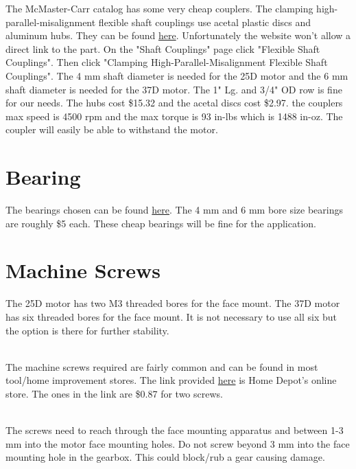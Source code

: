 \documentclass[12pt, onecolumn]{article}
\begin{document}
The McMaster-Carr catalog has some very cheap couplers. The clamping high-parallel-misalignment flexible shaft couplings use acetal plastic discs and aluminum hubs. They can be found \href{https://www.mcmaster.com/shaft-couplings}{here}. Unfortunately the website won't allow a direct link to the part. On the "Shaft Couplings" page click "Flexible Shaft Couplings". Then click "Clamping High-Parallel-Misalignment Flexible Shaft Couplings". The 4 mm shaft diameter is needed for the 25D motor and the 6 mm shaft diameter is needed for the 37D motor. The 1" Lg. and 3/4" OD row is fine for our needs. The hubs cost \$15.32 and the acetal discs cost \$2.97. the couplers max speed is 4500 rpm and the max torque is 93 in-lbs which is 1488 in-oz. The coupler will easily be able to withstand the motor.


\section{Bearing}


The bearings chosen can be found
\href{https://www.grainger.com/category/power-transmission/bearings/ball-bearings/miniature-ball-bearings}{here}. The 4 mm and 6 mm bore size bearings are roughly \$5 each. These cheap bearings will be fine for the application.


\section{Machine Screws}


The 25D motor has two M3 threaded bores for the face mount. The 37D motor has six threaded bores for the face mount. It is not necessary to use all six but the option is there for further stability.\\
\\


The machine screws required are fairly common and can be found in most tool/home improvement stores. The link provided \href{https://www.homedepot.com/p/Everbilt-M3-0-5-x-16-mm-Phillips-Pan-Head-Stainless-Steel-Machine-Screw-2-Pack-842718/204846005}{here} is Home Depot's online store. The ones in the link are \$0.87 for two screws. \\
\\


The screws need to reach through the face mounting apparatus and between 1-3 mm into the motor face mounting holes. Do not screw beyond 3 mm into the face mounting hole in the gearbox. This could block/rub a gear causing damage.
\end{document}
